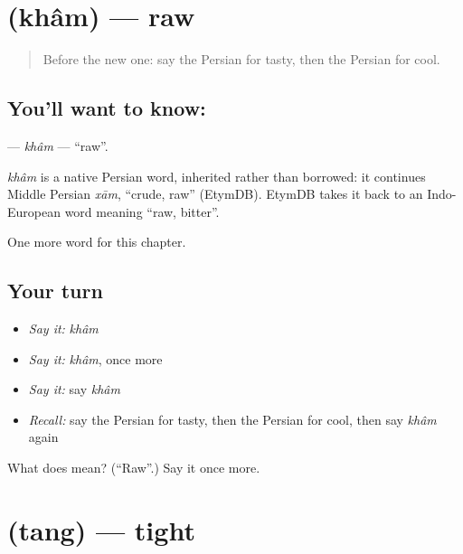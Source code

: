 \section[\texorpdfstring{\fa{خام} (khâm)}{خام (khâm)}]{ (khâm) — raw}

\label{lesson:FA-C161-kham}



\begin{quote}
Before the new one: say the Persian for tasty, then the Persian for cool.
\end{quote}

\subsection*{You'll want to know: }
\textbf{} — \emph{khâm} — \textquotedblleft{}raw\textquotedblright{}.

\begin{cousinweb}
\emph{khâm} is a native Persian word, inherited rather than borrowed: it continues Middle Persian \emph{xām}, \textquotedblleft{}crude, raw\textquotedblright{} (EtymDB). EtymDB takes it back to an Indo-European word meaning \textquotedblleft{}raw, bitter\textquotedblright{}.
\end{cousinweb}

\begin{grammarlens}[title={What you've built}]
One more word for this chapter.
\end{grammarlens}

\subsection*{Your turn}
\begin{itemize}
\raggedright
  \item \emph{Say it:} \emph{khâm}
  \item \emph{Say it:} \emph{khâm}, once more
  \item \emph{Say it:} say \emph{khâm}
  \item \emph{Recall:} say the Persian for tasty, then the Persian for cool, then say \emph{khâm} again
\end{itemize}

\begin{tcolorbox}[breakable,colback=teal!4,colframe=teal!35!black,title={Before you move on}]
What does  mean? (\textquotedblleft{}Raw\textquotedblright{}.) Say it once more.
\end{tcolorbox}
\section[\texorpdfstring{\fa{تنگ} (tang)}{تنگ (tang)}]{ (tang) — tight}

